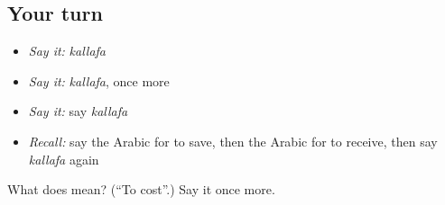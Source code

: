 \subsection*{Your turn}
\begin{itemize}
\raggedright
  \item \emph{Say it:} \emph{kallafa}
  \item \emph{Say it:} \emph{kallafa}, once more
  \item \emph{Say it:} say \emph{kallafa}
  \item \emph{Recall:} say the Arabic for to save, then the Arabic for to receive, then say \emph{kallafa} again
\end{itemize}

\begin{tcolorbox}[breakable,colback=teal!4,colframe=teal!35!black,title={Before you move on}]
What does  mean? (\textquotedblleft{}To cost\textquotedblright{}.) Say it once more.
\end{tcolorbox}
